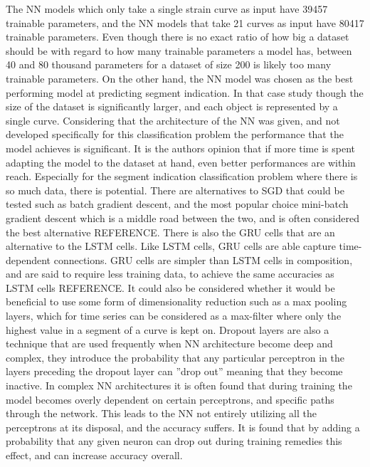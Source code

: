 The NN models which only take a single strain curve as input have 39457 trainable parameters, and the NN models that take 21 curves as input have 80417 trainable parameters.
Even though there is no exact ratio of how big a dataset should be with regard to how many trainable parameters a model has, between 40 and 80 thousand parameters for a dataset of size 200 is likely too many trainable parameters.
On the other hand, the NN model was chosen as the best performing model at predicting segment indication. 
In that case study though the size of the dataset is significantly larger, and each object is represented by a single curve. 
Considering that the architecture of the NN was given, and not developed specifically for this classification problem the performance that the model achieves is significant. 
It is the authors opinion that if more time is spent adapting the model to the dataset at hand, even better performances are within reach. 
Especially for the segment indication classification problem where there is so much data, there is potential.
There are alternatives to SGD that could be tested such as batch gradient descent, and the most popular choice mini-batch gradient descent which is a middle road between the two, and is often considered the best alternative REFERENCE.
There is also the GRU cells that are an alternative to the LSTM cells. Like LSTM cells, GRU cells are able capture time-dependent connections. GRU cells are simpler than LSTM cells in composition, and are said to require less training data, to achieve the same accuracies as LSTM cells REFERENCE.
It could also be considered whether it would be beneficial to use some form of dimensionality reduction such as a max pooling layers, which for time series can be considered as a max-filter where only the highest value in a segment of a curve is kept on. 
Dropout layers are also a technique that are used frequently when NN architecture become deep and complex, they introduce the probability that any particular perceptron in the layers preceding the dropout layer can ''drop out'' meaning that they become inactive.
In complex NN architectures it is often found that during training the model becomes overly dependent on certain perceptrons, and specific paths through the network. This leads to the NN not entirely utilizing all the perceptrons at its disposal, and the accuracy suffers. It is found that by adding a probability that any given neuron can drop out during training remedies this effect, and can increase accuracy overall.
